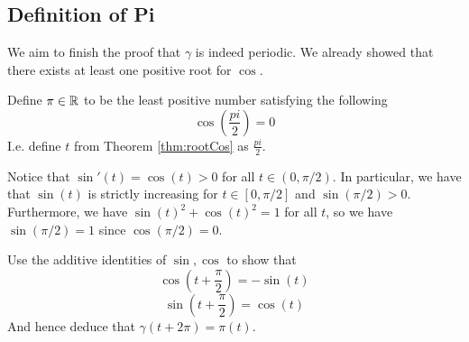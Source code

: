 \subsection{Definition of Pi}
We aim to finish the proof that $\gamma$ is indeed periodic. We already showed that there
exists at least one positive root for $\cos$.
\begin{definition}
    Define $\pi\in\mathbb R$ to be the least positive number satisfying the following
    \[\cos(\frac{pi}{2})=0\]
    I.e. define  $t$ from Theorem \ref{thm:rootCos} as $\frac{pi}{2}$.
    \label{def:pi}
\end{definition}
Notice that $\sin'(t)=\cos(t)>0$ for all $t\in(0,\pi/2)$. In particular, we have that
$\sin(t)$ is strictly increasing for $t\in[0,\pi/2]$ and $\sin(\pi/2)>0$. Furthermore, we
have $\sin(t)^2+\cos(t)^2=1$ for all $t$, so we have $\sin(\pi/2)=1$ since
$\cos(\pi/2)=0$.

\begin{exercise}
    Use the additive identities of $\sin,\cos$ to show that 
    \[\cos(t+\frac{\pi}{2})=-\sin(t)\]
    \[\sin(t+\frac{\pi}{2})=\cos(t)\]
    And hence deduce that $\gamma(t+2\pi)=\pi(t)$.
\end{exercise}

